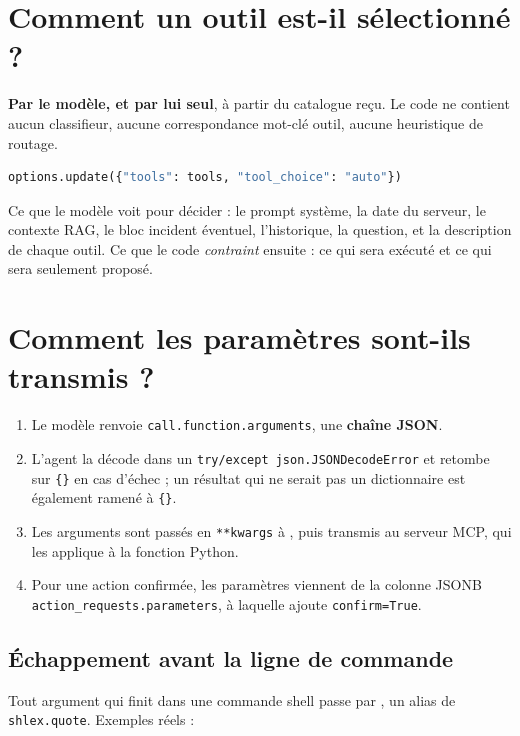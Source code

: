 \section{Comment un outil est-il sélectionné ?}

\textbf{Par le modèle, et par lui seul}, à partir du catalogue reçu. Le code ne
contient aucun classifieur, aucune correspondance mot-clé \arrowto{} outil,
aucune heuristique de routage.

\begin{lstlisting}[language=Python,caption={La seule instruction de sélection}]
options.update({"tools": tools, "tool_choice": "auto"})
\end{lstlisting}

\noindent
Ce que le modèle voit pour décider : le prompt système, la date du serveur, le
contexte RAG, le bloc incident éventuel, l'historique, la question, et la
description de chaque outil. Ce que le code \emph{contraint} ensuite : ce qui
sera exécuté et ce qui sera seulement proposé.

\section{Comment les paramètres sont-ils transmis ?}

\begin{enumerate}
  \item Le modèle renvoie \texttt{call.function.arguments}, une \textbf{chaîne
  JSON}.
  \item L'agent la décode dans un \texttt{try/except json.JSONDecodeError} et
  retombe sur \texttt{\{\}} en cas d'échec ; un résultat qui ne serait pas un
  dictionnaire est également ramené à \texttt{\{\}}.
  \item Les arguments sont passés en \texttt{**kwargs} à , puis
  transmis au serveur MCP, qui les applique à la fonction Python.
  \item Pour une action confirmée, les paramètres viennent de la colonne JSONB
  \texttt{action\_requests.parameters}, à laquelle
   ajoute \texttt{confirm=True}.
\end{enumerate}

\subsection*{Échappement avant la ligne de commande}
Tout argument qui finit dans une commande shell passe par , un
alias de \texttt{shlex.quote}. Exemples réels :

